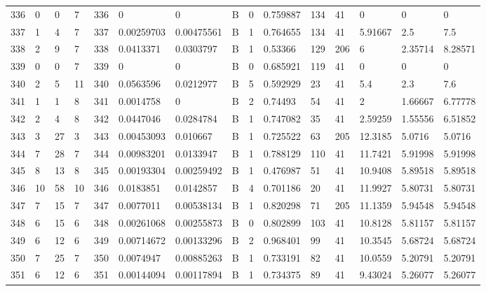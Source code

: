 \begin{latin}
\begin{longtable}{lllllllllllllll}
	336 & 0  & 0   & 7  & 336 & 0              & 0              & B & 0  & 0.759887 & 134  & 41   & 0       & 0       & 0       \\
	337 & 1  & 4   & 7  & 337 & 0.00259703     & 0.00475561     & B & 1  & 0.764655 & 134  & 41   & 5.91667 & 2.5     & 7.5     \\
	338 & 2  & 9   & 7  & 338 & 0.0413371      & 0.0303797      & B & 1  & 0.53366  & 129  & 206  & 6       & 2.35714 & 8.28571 \\
	339 & 0  & 0   & 7  & 339 & 0              & 0              & B & 0  & 0.685921 & 119  & 41   & 0       & 0       & 0       \\
	340 & 2  & 5   & 11 & 340 & 0.0563596      & 0.0212977      & B & 5  & 0.592929 & 23   & 41   & 5.4     & 2.3     & 7.6     \\
	341 & 1  & 1   & 8  & 341 & 0.0014758      & 0              & B & 2  & 0.74493  & 54   & 41   & 2       & 1.66667 & 6.77778 \\
	342 & 2  & 4   & 8  & 342 & 0.0447046      & 0.0284784      & B & 1  & 0.747082 & 35   & 41   & 2.59259 & 1.55556 & 6.51852 \\
	343 & 3  & 27  & 3  & 343 & 0.00453093     & 0.010667       & B & 1  & 0.725522 & 63   & 205  & 12.3185 & 5.0716  & 5.0716  \\
	344 & 7  & 28  & 7  & 344 & 0.00983201     & 0.0133947      & B & 1  & 0.788129 & 110  & 41   & 11.7421 & 5.91998 & 5.91998 \\
	345 & 8  & 13  & 8  & 345 & 0.00193304     & 0.00259492     & B & 1  & 0.476987 & 51   & 41   & 10.9408 & 5.89518 & 5.89518 \\
	346 & 10 & 58  & 10 & 346 & 0.0183851      & 0.0142857      & B & 4  & 0.701186 & 20   & 41   & 11.9927 & 5.80731 & 5.80731 \\
	347 & 7  & 15  & 7  & 347 & 0.0077011      & 0.00538134     & B & 1  & 0.820298 & 71   & 205  & 11.1359 & 5.94548 & 5.94548 \\
	348 & 6  & 15  & 6  & 348 & 0.00261068     & 0.00255873     & B & 0  & 0.802899 & 103  & 41   & 10.8128 & 5.81157 & 5.81157 \\
	349 & 6  & 12  & 6  & 349 & 0.00714672     & 0.00133296     & B & 2  & 0.968401 & 99   & 41   & 10.3545 & 5.68724 & 5.68724 \\
	350 & 7  & 25  & 7  & 350 & 0.0074947      & 0.00885263     & B & 1  & 0.733191 & 82   & 41   & 10.0559 & 5.20791 & 5.20791 \\
	351 & 6  & 12  & 6  & 351 & 0.00144094     & 0.00117894     & B & 1  & 0.734375 & 89   & 41   & 9.43024 & 5.26077 & 5.26077 \\

\end{longtable}
\end{latin}
